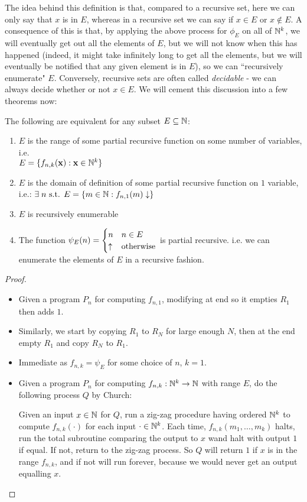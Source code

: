 \documentclass[10pt,a4paper]{article}
\begin{document}
The idea behind this definition is that, compared to a recursive set, here we can only say that $x$ is in $E$, whereas in a recursive set we can say if $x \in E$ or $x \notin E$. A consequence of this is that, by applying the above process for $\phi_E$ on all of $\mathbb{N}^k$, we will eventually get out all the elements of $E$, but we will not know when this has happened (indeed, it might take infinitely long to get all the elements, but we will eventually be notified that any given element is in $E$), so we can ``recursively enumerate" $E$. Conversely, recursive sets are often called \emph{decidable} - we can always decide whether or not $x \in E$. We will cement this discussion into a few theorems now:

\begin{theorem}
The following are equivalent for any subset $E \subseteq \mathbb{N}$:
\begin{enumerate}
\item $E$ is the range of some partial recursive function on some number of variables, i.e.\\ $E = \{f_{n,k}(\mathbf{x}) : \mathbf{x} \in \mathbb{N}^k\}$
\item $E$ is the domain of definition of some partial recursive function on $1$ variable, i.e.:
$\exists n \st E = \{m\in\N : f_{n,1}(m)\downarrow\}$
\item $E$ is recursively enumerable
\item The function $\psi_E(n) = \begin{cases} n & n \in E \\ \uparrow & \text{otherwise} \end{cases}$ is partial recursive. i.e. we can enumerate the elements of $E$ in a recursive fashion.
\end{enumerate}
\end{theorem}
\begin{proof}\item
\begin{itemize}
\item{} Given a program $P_n$ for computing $f_{n,1}$, modifying at end so it empties $R_1$ then adds $1$.
\item{} Similarly, we start by copying $R_1$ to $R_N$ for large enough $N$, then at the end empty $R_1$ and copy $R_N$ to $R_1$.
\item{} Immediate as $f_{n,k} = \psi_E$ for some choice of $n$, $k=1$.
\item{} Given a program $P_n$ for computing $f_{n,k}:\mathbb{N}^k \to \mathbb{N}$ with range $E$, do the following process $Q$ by Church:

Given an input $x\in \mathbb{N}$ for $Q$, run a zig-zag procedure having ordered $\mathbb{N}^k$ to compute $f_{n,k}(\cdot)$ for each input $\cdot \in \mathbb{N}^k$. Each time, $f_{n,k}(m_1,\ldots, m_k)$ halts, run the total subroutine comparing the output to $x$ wand halt with output $1$ if equal. If not, return to the zig-zag process. So $Q$ will return $1$ if $x$ is in the range $f_{n,k}$, and if not will run forever, because we would never get an output equalling $x$.
\end{itemize}
\end{proof}
\end{document}
